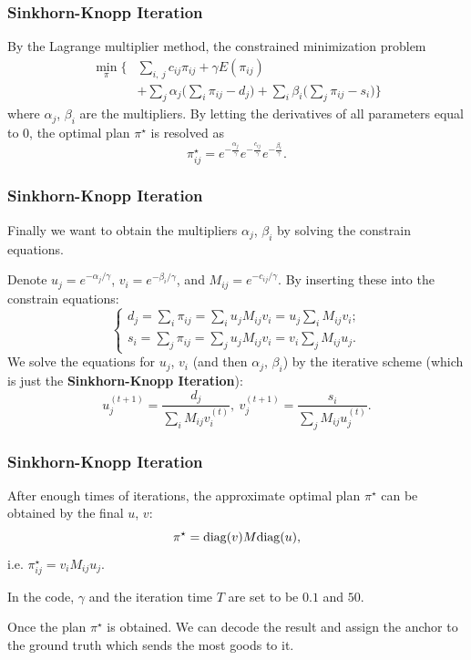 \documentclass[slidetop, mathserif, dvipsnames]{beamer}
\begin{document}
\begin{frame}
    \frametitle{Sinkhorn-Knopp Iteration}

    By the Lagrange multiplier method,
    the constrained minimization problem
    \begin{align*}
        \min_{\pi} \Big\{ & \sum_{i,~j} c_{ij}\pi_{ij}+\gamma E(\pi_{ij}) \\
            & + \sum_j \alpha_j\Big(\sum_i \pi_{ij} - d_j\Big)
            + \sum_i \beta_i \Big(\sum_j \pi_{ij} - s_i\Big)
            \Big\}
    \end{align*}
    where $\alpha_j$, $\beta_i$ are the multipliers.
    By letting the derivatives of all parameters equal to 0,
    the optimal plan $\pi^\star$ is resolved as
    \[
        \pi_{ij}^\star =
        e^{-\frac{\alpha_j}{\gamma}}e^{-\frac{c_{ij}}{\gamma}}
        e^{-\frac{\beta_i}{\gamma}}.
    \]

\end{frame}


\begin{frame}
    \frametitle{Sinkhorn-Knopp Iteration}

    Finally we want to obtain the multipliers $\alpha_j$, $\beta_i$
    by solving the constrain equations.

    \quad 

    Denote $u_j = e^{-\alpha_j/\gamma}$, $v_i = e^{-\beta_i/\gamma}$,
    and $M_{ij} = e^{-c_{ij}/\gamma}$.
    By inserting these into the constrain equations:
    \[
        \begin{cases}
        d_j = \sum_i \pi_{ij} = \sum_i u_jM_{ij}v_i = u_j \sum_i M_{ij}v_i; \\
        s_i = \sum_j \pi_{ij} = \sum_j u_jM_{ij}v_i = v_i \sum_j M_{ij}u_j.
        \end{cases}
    \]
    We solve the equations for $u_j$, $v_i$ (and then $\alpha_j$, $\beta_i$)
    by the iterative scheme (which is just the {\bf Sinkhorn-Knopp Iteration}):
    \[
        u_j^{(t+1)} = \dfrac{d_j}{\sum_i M_{ij}v_i^{(t)}},~
        v_j^{(t+1)} = \dfrac{s_i}{\sum_j M_{ij}u_j^{(t)}}.
    \]

\end{frame}

\begin{frame}
    \frametitle{Sinkhorn-Knopp Iteration}

    After enough times of iterations,
    the approximate optimal plan $\pi^\star$
    can be obtained by the final $u$, $v$:
    \[
        \pi^\star = {\rm diag}(v) M {\rm diag}(u),
    \]
    i.e. $\pi_{ij}^\star = v_iM_{ij}u_j$.

    \quad

    In the code, $\gamma$ and the iteration time $T$ are set to be $0.1$ and $50$.

    \quad 

    Once the plan $\pi^\star$ is obtained. We can decode the result and
    assign the anchor to the ground truth which sends the most goods to it.
\end{frame}
\end{document}
